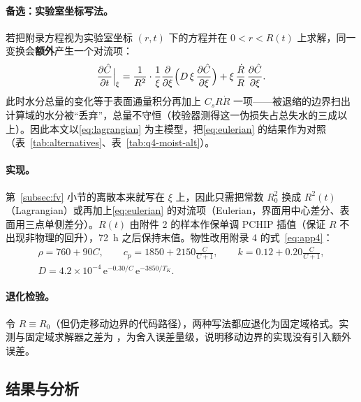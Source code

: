 \paragraph{备选：实验室坐标写法。} 若把附录方程视为实验室坐标 $(r,t)$ 下的方程并在 $0<r<R(t)$ 上求解，同一变换会\textbf{额外}产生一个对流项：
\begin{equation}
\frac{\partial \hat C}{\partial t}\Big|_{\xi}=\frac{1}{R^2}\cdot\frac1\xi\frac{\partial }{\partial \xi}\Bigl(D\,\xi\,\frac{\partial \hat C}{\partial \xi}\Bigr)+\xi\,\frac{\dot R}{R}\,\frac{\partial \hat C}{\partial \xi}.
\label{eq:eulerian}
\end{equation}
此时水分总量的变化等于表面通量积分再加上 $C_sR\dot R$ 一项——被退缩的边界扫出计算域的水分被“丢弃”，总量不守恒（校验器测得这一伪损失占总失水的三成以上）。因此本文以\eqref{eq:lagrangian} 为主模型，把\eqref{eq:eulerian} 的结果作为对照（表~\ref{tab:alternatives}、表~\ref{tab:q4-moist-alt}）。


\paragraph{实现。} 第~\ref{subsec:fv} 小节的离散本来就写在 $\xi$ 上，因此只需把常数 $R_0^2$ 换成 $R^2(t)$（Lagrangian）或再加上\eqref{eq:eulerian} 的对流项（Eulerian，界面用中心差分、表面用三点单侧差分）。$R(t)$ 由附件 2 的样本作保单调 PCHIP 插值\cite{fritsch1980}（保证 $R$ 不出现非物理的回升），\SI{72}{\hour} 之后保持末值。物性改用附录 4 的式~\eqref{eq:app4}：
\begin{equation}
\begin{gathered}
\rho=760+90C,\qquad c_p=1850+2150\tfrac{C}{C+1},\qquad k=0.12+0.20\tfrac{C}{C+1},\\[-2pt]
D=4.2\times10^{-4}\,\mathrm{e}^{-0.30/C}\,\mathrm{e}^{-3850/T_K}.
\end{gathered}
\label{eq:app4}
\end{equation}

\paragraph{退化检验。} 令 $R\equiv R_0$（但仍走移动边界的代码路径），两种写法都应退化为固定域格式。实测与固定域求解器之差为 \sci{\valQfourDegenerateMaxDiff}，为舍入误差量级，说明移动边界的实现没有引入额外误差。

\subsection{结果与分析}



